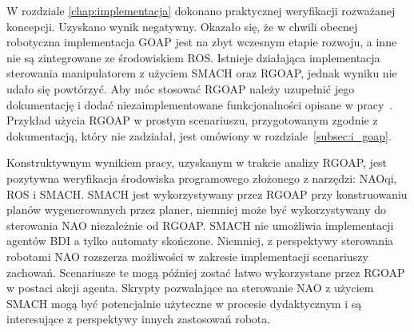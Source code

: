 W rozdziale \ref{chap:implementacja} dokonano praktycznej weryfikacji rozważanej koncepcji. Uzyskano wynik negatywny. Okazało się, że w chwili obecnej robotyczna implementacja GOAP jest na zbyt wczesnym etapie rozwoju, a inne nie są zintegrowane ze środowiskiem ROS. Istnieje działająca implementacja sterowania manipulatorem z użyciem SMACH oraz RGOAP, jednak wyniku nie udało się powtórzyć. Aby móc stosować RGOAP należy uzupełnić jego dokumentację i dodać niezaimplementowane funkcjonalności opisane w pracy~\cite{KOLB}. Przykład użycia RGOAP w prostym scenariuszu, przygotowanym zgodnie z dokumentacją, który nie zadziałał, jest omówiony w rozdziale~\ref{subsec:i_goap}. 


Konstruktywnym wynikiem pracy, uzyskanym w trakcie analizy RGOAP, 
jest pozytywna weryfikacja środowiska programowego złożonego z narzędzi: NAOqi, ROS i SMACH. SMACH jest wykorzystywany przez RGOAP przy konstruowaniu planów wygenerowanych przez planer, niemniej może być wykorzystywany do sterowania NAO niezależnie od RGOAP. SMACH nie umożliwia implementacji agentów BDI a tylko automaty skończone. Niemniej, z perspektywy sterowania robotami NAO rozszerza możliwości w zakresie implementacji scenariuszy zachowań. Scenariusze te mogą później zostać łatwo wykorzystane przez RGOAP w postaci akcji agenta. Skrypty pozwalające na sterowanie NAO z użyciem SMACH mogą być potencjalnie użyteczne w procesie dydaktycznym i są interesujące z perspektywy innych zastosowań robota.




